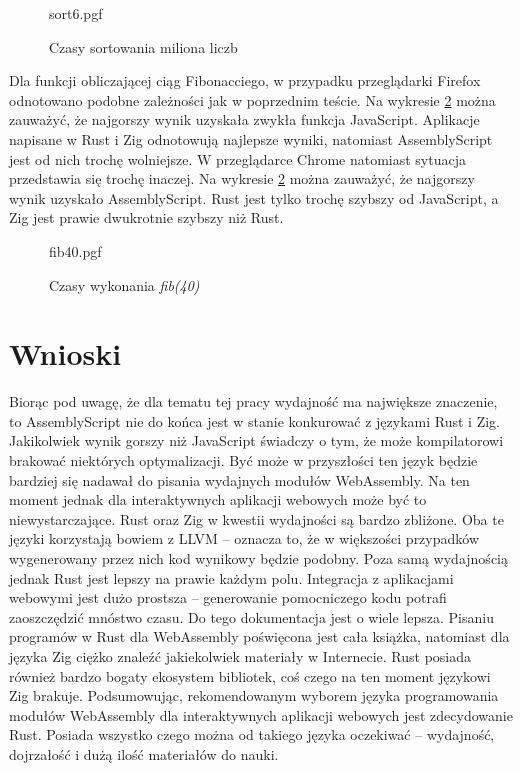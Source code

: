 \documentclass[language=polish,type=master]{aghmodern}
\begin{document}
\begin{figure}[H]
    \centering
    {sort6.pgf}
    \caption{Czasy sortowania miliona liczb}
    \label{fig:sort6}
\end{figure}

Dla funkcji obliczającej ciąg Fibonacciego, w przypadku przeglądarki Firefox odnotowano podobne zależności jak w poprzednim teście.
Na wykresie \ref{fig:fib40} można zauważyć, że najgorszy wynik uzyskała zwykła funkcja JavaScript.
Aplikacje napisane w Rust i Zig odnotowują najlepsze wyniki, natomiast AssemblyScript jest od nich trochę wolniejsze.
W przeglądarce Chrome natomiast sytuacja przedstawia się trochę inaczej.
Na wykresie \ref{fig:fib40} można zauważyć, że najgorszy wynik uzyskało AssemblyScript.
Rust jest tylko trochę szybszy od JavaScript, a Zig jest prawie dwukrotnie szybszy niż Rust.

\begin{figure}[H]
    \centering
    {fib40.pgf}
    \caption{Czasy wykonania \emph{fib(40)}}
    \label{fig:fib40}
\end{figure}

\section{Wnioski}
Biorąc pod uwagę, że dla tematu tej pracy wydajność ma największe znaczenie, to AssemblyScript nie do końca jest w stanie konkurować z językami Rust i Zig.
Jakikolwiek wynik gorszy niż JavaScript świadczy o tym, że może kompilatorowi brakować niektórych optymalizacji.
Być może w przyszłości ten język będzie bardziej się nadawał do pisania wydajnych modułów WebAssembly.
Na ten moment jednak dla interaktywnych aplikacji webowych może być to niewystarczające.
Rust oraz Zig w kwestii wydajności są bardzo zbliżone.
Oba te języki korzystają bowiem z LLVM -- oznacza to, że w większości przypadków wygenerowany przez nich kod wynikowy będzie podobny.
Poza samą wydajnością jednak Rust jest lepszy na prawie każdym polu.
Integracja z aplikacjami webowymi jest dużo prostsza -- generowanie pomocniczego kodu potrafi zaoszczędzić mnóstwo czasu.
Do tego dokumentacja jest o wiele lepsza.
Pisaniu programów w Rust dla WebAssembly poświęcona jest cała książka, natomiast dla języka Zig ciężko znaleźć jakiekolwiek materiały w Internecie.
Rust posiada również bardzo bogaty ekosystem bibliotek, coś czego na ten moment językowi Zig brakuje.
Podsumowując, rekomendowanym wyborem języka programowania modułów WebAssembly dla interaktywnych aplikacji webowych jest zdecydowanie Rust.
Posiada wszystko czego można od takiego języka oczekiwać -- wydajność, dojrzałość i dużą ilość materiałów do nauki.
\end{document}
